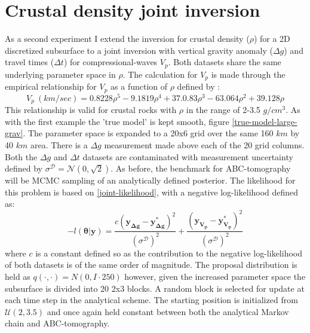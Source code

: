 \section{Crustal density joint inversion}

As a second experiment I extend the inversion for crustal density ($\rho$) for a 2D discretized subsurface to a joint inversion with vertical gravity anomaly ($\Delta g$) and travel times ($\Delta t$) for compressional-waves $V_p$. Both datasets share the same underlying parameter space in $\rho$. The calculation for $V_p$ is made through the empirical relationship for $V_p$ as a function of $\rho$ defined by \citet{Brocher2005}:
\begin{equation}
	V_p\ (km/sec) = 0.8228\rho^5 - 9.1819\rho^4 + 37.0.83\rho^3 - 63.064\rho^2 + 39.128\rho
	\label{rhotovp}
\end{equation}
This relationship is valid for crustal rocks with $\rho$ in the range of 2-3.5 $g/cm^3$. As with the first example the 'true model' is kept smooth, figure \ref{true-model-large-grav}. The parameter space is expanded to a 20x6 grid over the same 160 $km$ by 40 $km$ area. There is a $\Delta g$ measurement made above each of the 20 grid columns. Both the $\Delta g$ and $\Delta t$ datasets are contaminated with measurement uncertainty defined by $\sigma^{\mathcal{D}} = \mathcal{N}(0,\sqrt{2})$. As before, the benchmark for ABC-tomography will be MCMC sampling of an analytically defined posterior. The likelihood for this problem is based on \ref{joint-likelihood}, with a negative log-likelihood defined as:
\begin{equation}
	-l(\bm{\theta}|\bm{y}) = \frac{c(\bm{y_{\Delta g}}-\bm{y^*_{\Delta g}})^2}{(\sigma^{\mathcal{D}})^2} + \frac{(\bm{y_{V_p}}-\bm{y^*_{V_p}})^2}{(\sigma^{\mathcal{D}})^2}
\end{equation}
where $c$ is a constant defined so as the contribution to the negative log-likelihood of both datasets is of the same order of magnitude. The proposal distribution is held as $q(\cdot,\cdot) = N(0,I\cdot250)$ however, given the increased parameter space the subsurface is divided into 20 2x3 blocks. A random block is selected for update at each time step in the analytical scheme. The starting position is initialized from $\mathcal{U}(2,3.5)$  and once again held constant between both the analytical Markov chain and ABC-tomography. \par

